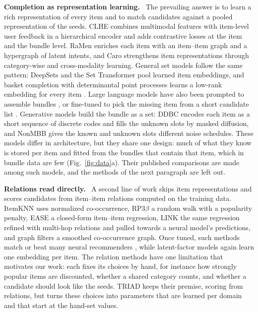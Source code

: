 \documentclass[runningheads]{llncs}
\renewcommand{\paragraph}[1]{\smallskip\noindent\textbf{#1}\ }
\begin{document}
\paragraph{Completion as representation learning.} The prevailing answer is to learn a rich representation of every
item and to match candidates against a pooled representation of the seeds. CLHE \cite{clhe} combines multimodal
features with item-level user feedback in a hierarchical encoder and adds contrastive losses at the item and the
bundle level. RaMen \cite{ramen} enriches each item with an item--item graph and a hypergraph of latent intents, and
Caro \cite{caro} strengthens item representations through category-wise and cross-modality learning. General set
models follow the same pattern: DeepSets \cite{deepsets} and the Set Transformer \cite{settransformer} pool learned
item embeddings, and basket completion with determinantal point processes learns a low-rank embedding for every item
\cite{gartrell2017}. Large language models have also been prompted to assemble bundles \cite{adabundle}, or fine-tuned
to pick the missing item from a short candidate list \cite{bundlemllm}. Generative models build the bundle as a set:
DDBC \cite{ddbc} encodes each item as a short sequence of discrete codes and fills the unknown slots by masked
diffusion, and NonMBB \cite{nonmbb} gives the known and unknown slots different noise schedules. These models
differ in architecture, but they share one design: much of what they know is stored per item and fitted from the
bundles that contain that item, which in bundle data are few (Fig.~\ref{fig:data}a). Their published comparisons are
made among such models, and the methods of the next paragraph are left out.

\paragraph{Relations read directly.} A second line of work skips item representations and scores candidates from
item--item relations computed on the training data. ItemKNN \cite{sarwar2001} uses normalized co-occurrence, RP3$\beta$
\cite{rp3beta} a random walk with a popularity penalty, EASE \cite{steck2019} a closed-form item--item regression,
LINK \cite{link} the same regression refined with multi-hop relations and pulled towards a neural model's predictions,
and graph filters \cite{gfcf,sgfcf} a smoothed co-occurrence graph. Once tuned, such methods match or beat many neural
recommenders \cite{dacrema,rendle2020}, while latent-factor models \cite{hu2008,bpr,lightgcn} again learn one
embedding per item. The relation methods have one limitation that motivates our work: each fixes its choices by hand,
for instance how strongly popular items are discounted, whether a shared category counts, and whether a candidate
should look like the seeds. TRIAD keeps their premise, scoring from relations, but turns these choices into
parameters that are learned per domain and that start at the hand-set values.
\end{document}
